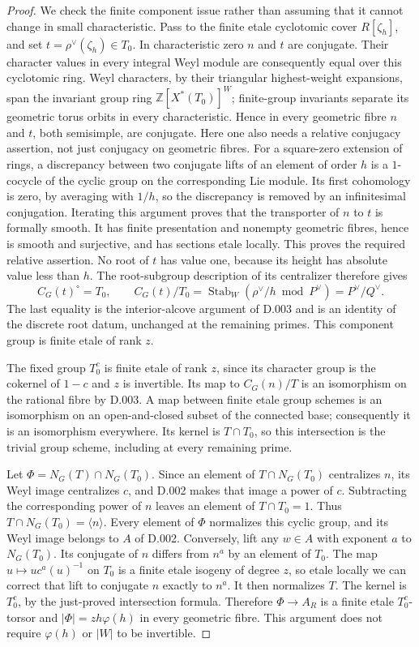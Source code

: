 \begin{proof}
We check the finite component issue rather than assuming that it
cannot change in small characteristic.  Pass to the finite etale
cyclotomic cover $R[\zeta_h]$, and set
$t=\rho^\vee(\zeta_h)\in T_0$.  In characteristic zero $n$ and $t$
are conjugate.  Their character values in every integral Weyl
module are consequently equal over this cyclotomic ring.  Weyl
characters, by their triangular highest-weight expansions, span
the invariant group ring $\mathbb Z[X^*(T_0)]^W$; finite-group
invariants separate its geometric torus orbits in every
characteristic.  Hence in every geometric fibre $n$ and $t$,
both semisimple, are conjugate.  Here one also needs a relative
conjugacy assertion, not just conjugacy on geometric fibres.
For a square-zero extension of rings, a discrepancy between two
conjugate lifts of an element of order $h$ is a $1$-cocycle of
the cyclic group on the corresponding Lie module.  Its first
cohomology is zero, by averaging with $1/h$, so the discrepancy
is removed by an infinitesimal conjugation.  Iterating this
argument proves that the transporter of $n$ to $t$ is formally
smooth.  It has finite presentation and nonempty geometric
fibres, hence is smooth and surjective, and has sections etale
locally.  This proves the required relative assertion.
No root of $t$ has value one, because its height has absolute value
less than $h$.  The root-subgroup description of its centralizer
therefore gives
\[
C_G(t)^\circ=T_0,\qquad
C_G(t)/T_0=\operatorname{Stab}_{W}(\rho^\vee/h\bmod P^\vee)
=P^\vee/Q^\vee.
\]
The last equality is the interior-alcove argument of D.003 and is
an identity of the discrete root datum, unchanged at the remaining
primes.  This component group is finite etale of rank $z$.

The fixed group $T_0^c$ is finite etale of rank $z$, since its
character group is the cokernel of $1-c$ and $z$ is invertible.
Its map to $C_G(n)/T$ is an isomorphism on the rational fibre by
D.003.  A map between finite etale group schemes is an isomorphism
on an open-and-closed subset of the connected base; consequently
it is an isomorphism everywhere.  Its kernel is $T\cap T_0$, so
this intersection is the trivial group scheme, including at every
remaining prime.

Let $\Phi=N_G(T)\cap N_G(T_0)$.  Since an element of
$T\cap N_G(T_0)$ centralizes $n$, its Weyl image centralizes $c$,
and D.002 makes that image a power of $c$.  Subtracting the
corresponding power of $n$ leaves an element of $T\cap T_0=1$.
Thus $T\cap N_G(T_0)=\langle n\rangle$.  Every element of $\Phi$
normalizes this cyclic group, and its Weyl image belongs to $A$
of D.002.  Conversely, lift any $w\in A$ with exponent $a$ to
$N_G(T_0)$.  Its conjugate of $n$ differs from $n^a$ by an element
of $T_0$.  The map $u\mapsto u c^a(u)^{-1}$ on $T_0$ is a finite
etale isogeny of degree $z$, so etale locally we can correct that
lift to conjugate $n$ exactly to $n^a$.  It then normalizes $T$.
The kernel is $T_0^c$, by the just-proved intersection formula.
Therefore $\Phi\to A_R$ is a finite etale $T_0^c$-torsor and
$|\Phi|=zh\varphi(h)$ in every geometric fibre.  This argument
does not require $\varphi(h)$ or $|W|$ to be invertible.


\end{proof}
